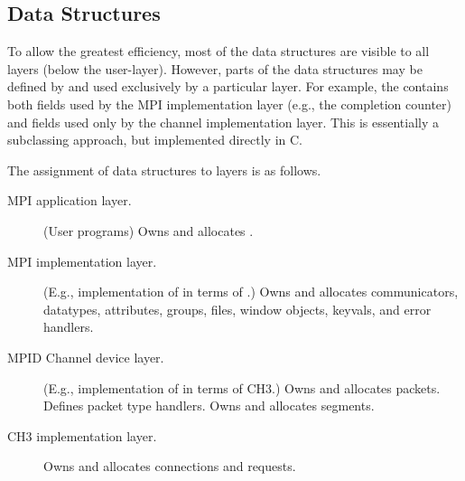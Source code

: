 \documentclass{article}
\begin{document}
\subsection{Data Structures}
To allow the greatest efficiency, most of the data structures are
visible to all layers (below the user-layer).  However, parts of the
data structures may be defined by and used exclusively by a particular
layer.  For example, the  contains both fields used
by the MPI implementation layer (e.g., the completion counter) and
fields used only by the channel implementation layer.  This is
essentially a subclassing approach, but implemented directly in C.

The assignment of data structures to layers is as follows.
\begin{description}
\item[MPI application layer.](User programs) Owns and allocates
  . 
\item[MPI implementation layer.](E.g., implementation of  in
  terms of .) Owns and allocates communicators, datatypes,
  attributes, groups, files, window objects, keyvals, and error handlers.
\item[MPID Channel device layer.](E.g., implementation of
   in terms of CH3.) Owns and allocates packets.
  Defines packet type handlers.  Owns and allocates segments.
\item[CH3 implementation layer.] Owns and allocates connections and requests.
\end{description}







\end{document}
